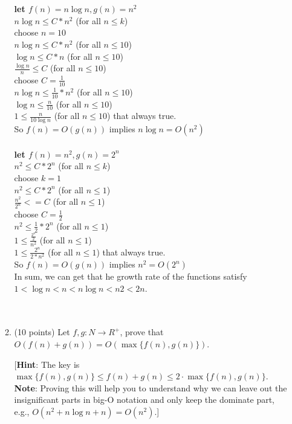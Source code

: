 \documentclass[12pt]{article}
\begin{document}
\begin{enumerate}
\begin{enumerate}
{	\\
	\\\textbf{let $f(n)=n\log n, g(n) = n^2$}
	\\$ n\log n \le C*n^2$ (for all $n\le k$)
	\\ choose $n=10$
	\\$ n\log n \le C*n^2$ (for all $n\le 10$)
	\\$ \log n \le C*n$ (for all $n\le 10$)
	\\$\frac{\log n}{n}\le C$ (for all $n\le 10$)
	\\ choose $C= \frac{1}{10}$
	\\$ n\log n \le \frac{1}{10}*n^2$ (for all $n \le 10$)
	\\$\log n \le \frac{n}{10}$ (for all $n\le 10$)
	\\ $1 \le \frac{n}{10\log n}$ (for all $n\le 10$) that always true.
	\\So $f(n) = O(g(n))$ implies $n\log n = O(n^2)$
	\\
	\\\textbf{let $f(n)=n^2, g(n) = 2^n$}
	\\$n^2 \le C*2^n$ (for all $n\le k$)
	\\choose $k=1$
	\\$n^2 \le C*2^n$ (for all $n\le 1$)
	\\$\frac{n^2}{2^n}<= C$ (for all $n\le 1$)
	\\ choose $C= \frac{1}{2}$
	\\$n^2 \le \frac{1}{2}*2^n$ (for all $n\le 1$)
	\\$1\le \frac{\frac{2^n}{2}}{n^2}$ (for all $n\le 1$)
	\\$1\le \frac{2^n}{2*n^2}$ (for all $n\le 1$) that always true.
	\\So $f(n) = O(g(n))$ implies $n^2 = O(2^n)$
	\\ In sum, we can get that he  growth  rate  of  the  functions  satisfy $1 <\log n < n < n\log n < n2<2n$.
	\\
	\\
	\\
	}

	\item (10 points) Let $f,g:N\rightarrow R^+$, prove that $O(f(n)+g(n))=O(\max\{f(n),g(n)\})$.
	
	[\textbf{Hint}: The key is $\max\{f(n),g(n)\}\le f(n)+g(n)\le 2\cdot\max\{f(n),g(n)\}$. \textbf{Note}: Proving this will help you to understand why we can leave out the insignificant parts in big-O notation and only keep the dominate part, e.g., $O(n^2+n\log n+n)=O(n^2)$.]
	

\end{enumerate}
\end{enumerate}
\end{document}
